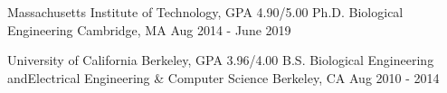 
\begin{cventries}
  \cventry
    {Massachusetts Institute of Technology, GPA 4.90/5.00} %
    {Ph.D. Biological Engineering} %
    {Cambridge, MA} %
    {Aug 2014 - June 2019} %
    {
    }

\vspace{-0.5\baselineskip}

  \cventry
    {{\vspace{-1.25\baselineskip}}University of California Berkeley, GPA 3.96/4.00} %
    {B.S. Biological Engineering {\normalfont{}and}\newline{}Electrical Engineering \& Computer Science{\vspace{-\baselineskip}}} %
    {Berkeley, CA} %
    {Aug 2010 - 2014} %
    {
    }

\end{cventries}
